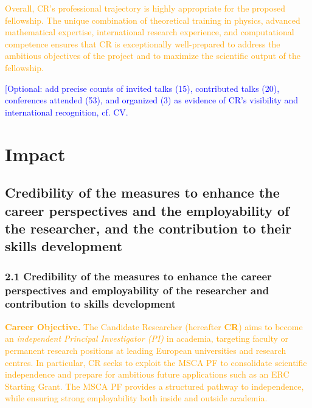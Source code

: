 \documentclass[11pt,draftproposal]{msca-pf}
\begin{document}
\textcolor{orange}{Overall, CR’s professional trajectory is highly appropriate for the proposed fellowship. The unique combination of theoretical training in physics, advanced mathematical expertise, international research experience, and computational competence ensures that CR is exceptionally well-prepared to address the ambitious objectives of the project and to maximize the scientific output of the fellowship.}  

\textcolor{blue}{[Optional: add precise counts of invited talks (15), contributed talks (20), conferences attended (53), and organized (3) as evidence of CR’s visibility and international recognition, cf. CV.}  




\section{Impact }
\label{sc:impact}


\subsection{Credibility of the measures to enhance the career perspectives
    and the employability of the researcher, and the contribution to their skills
    development}
\label{ssc:impact: career}

 \subsubsection*{2.1 Credibility of the measures to enhance the career perspectives and employability of the researcher and contribution to skills development}

\textcolor{orange}{\textbf{Career Objective.} The Candidate Researcher (hereafter \textbf{CR}) aims to become an \emph{independent Principal Investigator (PI)} in academia, targeting faculty or permanent research positions at leading European universities and research centres. In particular, CR seeks to exploit the MSCA PF to consolidate scientific independence and prepare for ambitious future applications such as an ERC Starting Grant. The MSCA PF provides a structured pathway to independence, while ensuring strong employability both inside and outside academia.}
\end{document}
